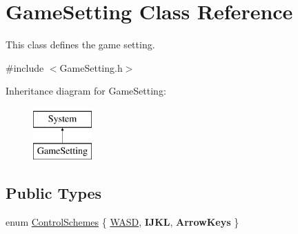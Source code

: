 \hypertarget{class_game_setting}{}\section{Game\+Setting Class Reference}
\label{class_game_setting}


This class defines the game setting.  




{\ttfamily \#include $<$Game\+Setting.\+h$>$}

Inheritance diagram for Game\+Setting\+:\begin{figure}[H]
\begin{center}
\leavevmode
\includegraphics[height=2.000000cm]{class_game_setting}
\end{center}
\end{figure}
\subsection*{Public Types}
\begin{DoxyCompactItemize}
\item 
enum \mbox{\hyperlink{class_game_setting_aeff0cf4cbeffbd2a48db8ac3a06de9f4}{Control\+Schemes}} \{ \mbox{\hyperlink{class_game_setting_aeff0cf4cbeffbd2a48db8ac3a06de9f4a0c45dfc775ae5077d468bd53cbfff55e}{W\+A\+SD}}, 
{\bfseries I\+J\+KL}, 
{\bfseries Arrow\+Keys}
 \}
\end{DoxyCompactItemize}
